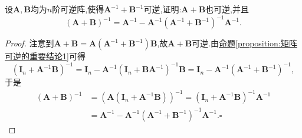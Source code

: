 \documentclass[../../main.tex]{subfiles}%
\begin{document}
\begin{example}\label{example:凑因子例2}
设\(\boldsymbol{A},\boldsymbol{B}\)均为\(n\)阶可逆阵,使得\(\boldsymbol{A}^{-1}+\boldsymbol{B}^{-1}\)可逆,证明:\(\boldsymbol{A}+\boldsymbol{B}\)也可逆,并且
\[
(\boldsymbol{A}+\boldsymbol{B})^{-1}=\boldsymbol{A}^{-1}-\boldsymbol{A}^{-1}(\boldsymbol{A}^{-1}+\boldsymbol{B}^{-1})^{-1}\boldsymbol{A}^{-1}.
\]
\end{example}
\begin{proof}
注意到\(\boldsymbol{A}+\boldsymbol{B}=\boldsymbol{A}(\boldsymbol{A}^{-1}+\boldsymbol{B}^{-1})\boldsymbol{B}\),故\(\boldsymbol{A}+\boldsymbol{B}\)可逆.由\hyperref[proposition:矩阵可逆的重要结论1]{命题\ref{proposition:矩阵可逆的重要结论1}}可得
\[
(\boldsymbol{I}_{n}+\boldsymbol{A}^{-1}\boldsymbol{B})^{-1}=\boldsymbol{I}_{n}-\boldsymbol{A}^{-1}(\boldsymbol{I}_{n}+\boldsymbol{B}\boldsymbol{A}^{-1})^{-1}\boldsymbol{B}=\boldsymbol{I}_{n}-\boldsymbol{A}^{-1}(\boldsymbol{A}^{-1}+\boldsymbol{B}^{-1})^{-1},
\]
于是
\begin{align*}
(\boldsymbol{A}+\boldsymbol{B})^{-1}&=(\boldsymbol{A}(\boldsymbol{I}_{n}+\boldsymbol{A}^{-1}\boldsymbol{B}))^{-1}=(\boldsymbol{I}_{n}+\boldsymbol{A}^{-1}\boldsymbol{B})^{-1}\boldsymbol{A}^{-1}\\
&=\boldsymbol{A}^{-1}-\boldsymbol{A}^{-1}(\boldsymbol{A}^{-1}+\boldsymbol{B}^{-1})^{-1}\boldsymbol{A}^{-1}.\square
\end{align*}
\end{proof}
\end{document}
